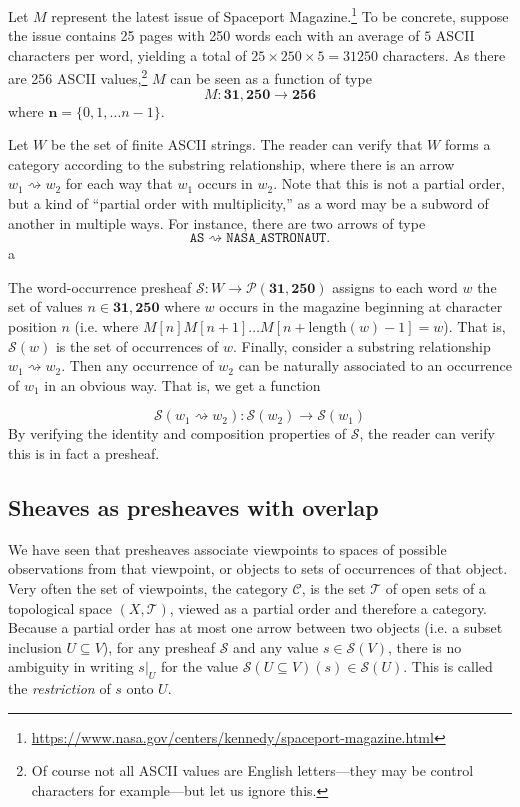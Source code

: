 \begin{example}\label{exm:words} Let $M$ represent the latest issue of Spaceport Magazine.\footnote{\url{https://www.nasa.gov/centers/kennedy/spaceport-magazine.html}} To be concrete, suppose the issue contains 25 pages with 250 words each with an average of $5$ ASCII characters per word, yielding a total of $25 \times 250 \times 5 = 31250$ characters. As there are 256 ASCII values,\footnote{Of course not all ASCII values are English letters---they may be control characters for example---but let us ignore this.} $M$ can be seen as a function of type
\[ M : \mathbf{31,250} \to \mathbf{256}\]
where $\mathbf{n} = \{0, 1, \ldots n-1\}$.

Let $W$ be the set of finite ASCII strings. The reader can verify that $W$ forms a category according to the substring relationship, where there is an arrow $w_1 \rightsquigarrow w_2$ for each way that $w_1$ occurs in $w_2$. Note that this is not a partial order, but a kind of ``partial order with multiplicity,'' as a word may be a subword of another in multiple ways. For instance, there are two arrows of type
\[\texttt{AS} \rightsquigarrow \texttt{NASA\_ASTRONAUT}.\]a



The word-occurrence presheaf $\mathcal{S} : W \to \mathcal{P}(\mathbf{31,250})$ assigns to each word $w$ the set of values $n \in \mathbf{31,250}$ where $w$ occurs in the magazine beginning at character position $n$ (i.e. where $M[n] M[n+1] \ldots M[n+\textrm{length}(w)-1] = w$). That is, $\mathcal{S}(w)$ is the set of occurrences of $w$. Finally, consider a substring relationship $w_1 \rightsquigarrow w_2$. Then any occurrence of $w_2$ can be naturally associated to an occurrence of $w_1$ in an obvious way. That is, we get a function

\[\mathcal{S}(w_1 \rightsquigarrow w_2) : \mathcal{S}(w_2) \to \mathcal{S}(w_1)\]
By verifying the identity and composition properties of $\mathcal{S}$, the reader can verify this is in fact a presheaf.
\end{example}

\subsection{Sheaves as presheaves with overlap}

We have seen that presheaves associate viewpoints to spaces of possible observations from that viewpoint, or objects to sets of occurrences of that object. Very often the set of viewpoints, the category $\mathcal{C}$, is the set $\mathcal{T}$ of open sets of a topological space $(X, \mathcal{T})$, viewed as a partial order and therefore a category. Because a partial order has at most one arrow between two objects (i.e. a subset inclusion $U \subseteq V$), for any presheaf $\mathcal{S}$ and any value $s \in \mathcal{S}(V)$, there is no ambiguity in writing $s|_U$ for the value $\mathcal{S}(U \subseteq V)(s) \in \mathcal{S}(U)$. This is called the \emph{restriction} of $s$ onto $U$.

